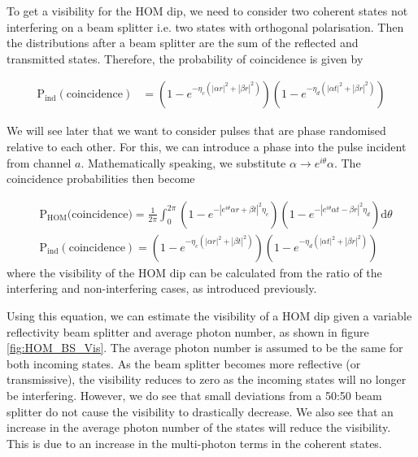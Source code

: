 To get a visibility for the HOM dip, we need to consider two coherent states not interfering on a beam splitter i.e. two states with orthogonal polarisation. Then the distributions after a beam splitter are the sum of the reflected and transmitted states. Therefore, the probability of coincidence is given by


\begin{align}
	\text{P}_\text{ind}(\text{coincidence}) &= \left(1 - e^{-\eta_c(|\alpha r|^2 + |\beta r|^2)}\right)\left(1 - e^{-\eta_d(|\alpha t|^2 + |\beta r|^2)}\right)
\end{align}

We will see later that we want to consider pulses that are phase randomised relative to each other. For this, we can introduce a phase into the pulse incident from channel $a$. Mathematically speaking, we substitute $\alpha \rightarrow  e^{i\theta} \alpha$. The coincidence probabilities then become

\begin{align}
	&\text{P}_\text{HOM}\text{(coincidence)} = \frac{1}{2\pi}\int_0^{2\pi}\left(1 - e^{-|e^{i\theta}\alpha r + \beta t|^2 \eta_c}\right)\left(1 - e^{-|e^{i\theta}\alpha t - \beta r|^2 \eta_d}\right)\text{d}\theta\\
	&\text{P}_\text{ind}(\text{coincidence}) = \left(1 - e^{-\eta_c(|\alpha r|^2 + |\beta t|^2)}\right)\left(1 - e^{-\eta_d(|\alpha t|^2 + |\beta r|^2)}\right)
\end{align}
where the visibility of the HOM dip can be calculated from the ratio of the interfering and non-interfering cases, as introduced previously.

Using this equation, we can estimate the visibility of a \ac{HOM} dip given a variable reflectivity beam splitter and average photon number, as shown in figure \ref{fig:HOM_BS_Vis}. The average photon number is assumed to be the same for both incoming states. As the beam splitter becomes more reflective (or transmissive), the visibility reduces to zero as the incoming states will no longer be interfering. However, we do see that small deviations from a {50:50} beam splitter do not cause the visibility to drastically decrease. We also see that an increase in the average photon number of the states will reduce the visibility. This is due to an increase in the multi-photon terms in the coherent states.


